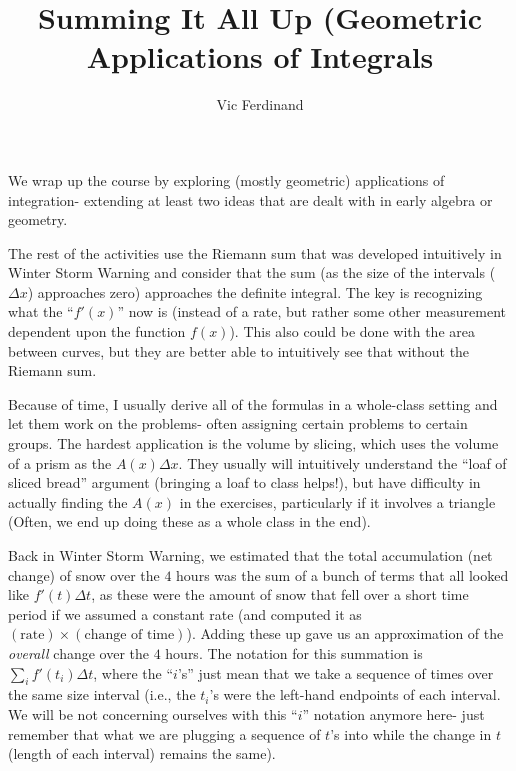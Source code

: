 \documentclass{ximera}
\author{Vic Ferdinand}
\title{Summing It All Up (Geometric Applications of Integrals}
\begin{document}
\begin{abstract}
\end{abstract}
\maketitle

\begin{instructorIntro}
We wrap up the course by exploring (mostly geometric) applications of integration- extending at least two ideas that are dealt with in early algebra or geometry.  

The rest of the activities use the Riemann sum that was developed intuitively in Winter Storm Warning and consider that the sum (as the size of the intervals ($\Delta x$) approaches zero) approaches the definite integral.  The key is recognizing what the ``$f'(x)$'' now is (instead of a rate, but rather some other measurement dependent upon the function $f(x)$).  This also could be done with the area between curves, but they are better able to intuitively see that without the Riemann sum. 

Because of time, I usually derive all of the formulas in a whole-class setting and let them work on the problems- often assigning certain problems to certain groups. The hardest application is the volume by slicing, which uses the volume of a prism as the $A(x) \Delta x$.  They usually will intuitively understand the ``loaf of sliced bread'' argument (bringing a loaf to class helps!), but have difficulty in actually finding the $A(x)$ in the exercises, particularly if it involves a triangle (Often, we end up doing these as a whole class in the end).

\end{instructorIntro}


Back in Winter Storm Warning, we estimated that the total accumulation (net change) of snow over the $4$ hours was the sum of a bunch of terms that all looked like  $f'(t) \Delta t$, as these were the amount of snow that fell over a short time period if we assumed a constant rate (and computed it as $(\text{rate}) \times (\text{change of time})$).  Adding these up gave us an approximation of the {\em overall} change over the $4$ hours.  The notation for this summation is  $\sum_i f'(t_i)\Delta t$, where the ``$i$'s'' just mean that we take a sequence of times over the same size interval (i.e., the  $t_i$'s were the left-hand endpoints of each interval. We will be not concerning ourselves with this ``$i$'' notation anymore here- just remember that what we are plugging a sequence of $t$'s into  while the change in $t$ (length of each interval) remains the same).  
\end{document}
